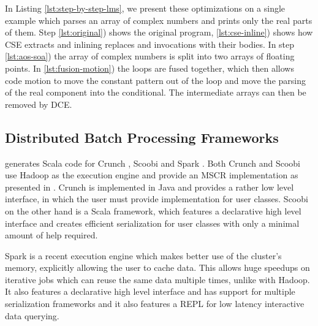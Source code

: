 In Listing \ref{lst:step-by-step-lms}, we present these optimizations on a
single example which parses an array of complex numbers and prints only the real parts of them.
Step \ref{lst:original}) shows the original program, \ref{lst:cse-inline}) shows
how CSE extracts  and inlining replaces  and 
invocations with their bodies. In step \ref{lst:aos-soa}) the array  of
complex numbers is split into two arrays of floating points.
In \ref{lst:fusion-motion}) the loops are fused together, which then allows code
motion to move the constant pattern out of the loop and move the parsing of the
real component into the conditional. The intermediate arrays can then be removed
by DCE.

\subsection{Distributed Batch Processing Frameworks}
\label{subsed:big-data-frameworks}

\tool generates Scala code for Crunch \cite{crunch}, Scoobi \cite{scoobi} and
Spark \cite{spark-nsdi}. Both Crunch and Scoobi use Hadoop as the execution
engine and provide an MSCR implementation as presented in
\cite{chambers_flumejava:_2010}. Crunch is implemented in Java and provides a
rather low level interface, in which the user must provide implementation for
user classes. Scoobi on the other hand is a Scala framework, which features a
declarative high level interface and creates efficient serialization for user
classes with only a minimal amount of help required.

Spark is a recent execution engine which makes better use of the cluster's
memory, explicitly allowing the user to cache data. This allows huge speedups on
iterative jobs which can reuse the same data multiple times, unlike with Hadoop.
It also features a declarative high level interface and has support for multiple
serialization frameworks and it also features a REPL for low latency
interactive data querying.
